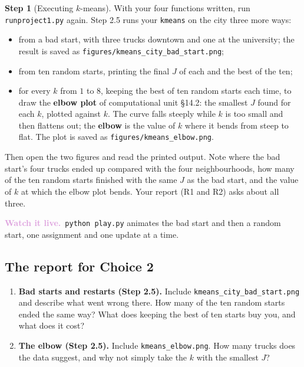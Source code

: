 \documentclass[11pt]{article}
\theoremstyle{definition}
\newtheorem{step}{Step}[section]
\newcommand{\watch}[1]{\par\smallskip\noindent
  {\small\sffamily\textcolor{Plum}{\textbf{Watch it live.}}\ #1}\par\smallskip}
\newcommand{\file}[1]{\texttt{#1}}
\begin{document}
\begin{step}[Executing $k$-means]
With your four functions written, run \file{runproject1.py} again. Step 2.5
runs your \texttt{kmeans} on the city three more ways:
\begin{itemize}[leftmargin=1.4em,itemsep=2pt,topsep=2pt]
  \item from a bad start, with three trucks downtown and one at the
        university; the result is saved as
        \file{figures/kmeans\_city\_bad\_start.png};
  \item from ten random starts, printing the final $J$ of each and the best
        of the ten;
  \item for every $k$ from $1$ to $8$, keeping the best of ten random starts
        each time, to draw the \textbf{elbow plot} of computational unit
        \S14.2: the smallest $J$ found for each $k$, plotted against $k$. The
        curve falls steeply while $k$ is too small and then flattens out; the
        \textbf{elbow} is the value of $k$ where it bends from steep to flat.
        The plot is saved as \file{figures/kmeans\_elbow.png}.
\end{itemize}
Then open the two figures and read the printed output. Note where the bad
start's four trucks ended up compared with the four neighbourhoods, how many of
the ten random starts finished with the same $J$ as the bad start, and the value
of $k$ at which the elbow plot bends. Your report (R1 and R2) asks about all
three.
\watch{\texttt{python play.py} animates the bad start and then a random start,
one assignment and one update at a time.}
\end{step}

\subsection*{The report for Choice 2}

\begin{enumerate}[label=\textbf{R\arabic*.},leftmargin=2.6em,itemsep=6pt,topsep=4pt]
  \item \textbf{Bad starts and restarts (Step 2.5).} Include
        \file{kmeans\_city\_bad\_start.png} and describe what went wrong
        there. How many of the ten random starts ended the same way? What does
        keeping the best of ten starts buy you, and what does it cost?
  \item \textbf{The elbow (Step 2.5).} Include \file{kmeans\_elbow.png}. How
        many trucks does the data suggest, and why not simply take the $k$
        with the smallest $J$?
\end{enumerate}
\end{document}
